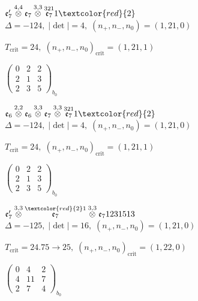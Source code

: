 \documentclass[10pt]{article}
\begin{document}
\smallskip

$\mathfrak{e}_7'\overset{4,4}{\otimes}\mathfrak{e}_7\overset{3,3}{\otimes}\overset{321}{\mathfrak{e}_7}1\textcolor{red}{2}$ \quad $\Delta=-124,\; |\det|=4,\; (n_+,n_-,n_0)=(1,21,0)$

\hspace{1em}$T_{\text{crit}}=24,\; (n_+,n_-,n_0)_{\text{crit}}=(1,21,1)$

\hspace{2em}$\left(\begin{smallmatrix}0 & 2 & 2 \\ 2 & 1 & 3 \\ 2 & 3 & 5\end{smallmatrix}\right)_{\!b_0}$

\smallskip

$\mathfrak{e}_6\overset{2,2}{\otimes}\mathfrak{e}_6\overset{3,3}{\otimes}\mathfrak{e}_7\overset{3,3}{\otimes}\overset{321}{\mathfrak{e}_7}1\textcolor{red}{2}$ \quad $\Delta=-124,\; |\det|=4,\; (n_+,n_-,n_0)=(1,21,0)$

\hspace{1em}$T_{\text{crit}}=24,\; (n_+,n_-,n_0)_{\text{crit}}=(1,21,1)$

\hspace{2em}$\left(\begin{smallmatrix}0 & 2 & 2 \\ 2 & 1 & 3 \\ 2 & 3 & 5\end{smallmatrix}\right)_{\!b_0}$

\smallskip

$\mathfrak{e}_7'\overset{3,3}{\otimes}\overset{\textcolor{red}{2}1}{\mathfrak{e}_7}\overset{3,3}{\otimes}\mathfrak{e}_71231513$ \quad $\Delta=-125,\; |\det|=16,\; (n_+,n_-,n_0)=(1,21,0)$

\hspace{1em}$T_{\text{crit}}=24.75 \to 25,\; (n_+,n_-,n_0)_{\text{crit}}=(1,22,0)$

\hspace{2em}$\left(\begin{smallmatrix}0 & 4 & 2 \\ 4 & 11 & 7 \\ 2 & 7 & 4\end{smallmatrix}\right)_{\!b_0}$
\end{document}
